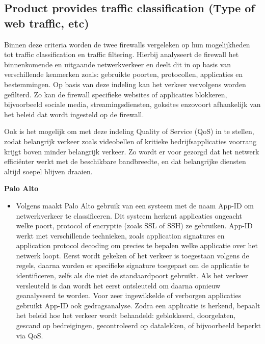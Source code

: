 \subsection{Product provides traffic classification (Type of web traffic, etc)}

Binnen deze criteria worden de twee firewalls vergeleken op hun mogelijkheden tot traffic classification en traffic filtering. Hierbij analyseert de firewall het binnenkomende en uitgaande netwerkverkeer en deelt dit in op basis van verschillende kenmerken zoals: gebruikte poorten, protocollen, applicaties en bestemmingen. Op basis van deze indeling kan het verkeer vervolgens worden gefilterd. Zo kan de firewall specifieke websites of applicaties blokkeren, bijvoorbeeld sociale media, streamingsdiensten, goksites enzovoort afhankelijk van het beleid dat wordt ingesteld op de firewall.

Ook is het mogelijk om met deze indeling Quality of Service (QoS) in te stellen, zodat belangrijk verkeer zoals videobellen of kritieke bedrijfsapplicaties voorrang krijgt boven minder belangrijk verkeer. Zo wordt er voor gezorgd dat het netwerk efficiënter werkt met de beschikbare bandbreedte, en dat belangrijke diensten altijd soepel blijven draaien.

\textbf{Palo Alto}
\begin{itemize}[label=\textbullet]
    \item Volgens \textcite{PaloAltoAPP2025} maakt Palo Alto gebruik van een systeem met de naam App-ID om netwerkverkeer te classificeren. Dit systeem herkent applicaties ongeacht welke poort, protocol of encryptie (zoals SSL of SSH) ze gebruiken. App-ID werkt met verschillende technieken, zoals application signatures en application protocol decoding om precies te bepalen welke applicatie over het netwerk loopt. Eerst wordt gekeken of het verkeer is toegestaan volgens de regels, daarna worden er specifieke signature toegepast om de applicatie te identificeren, zelfs als die niet de standaardpoort gebruikt. Als het verkeer versleuteld is dan wordt het eerst ontsleuteld om daarna opnieuw geanalyseerd te worden. Voor zeer ingewikkelde of verborgen applicaties gebruikt App-ID ook gedragsanalyse. Zodra een applicatie is herkend, bepaalt het beleid hoe het verkeer wordt behandeld: geblokkeerd, doorgelaten, gescand op bedreigingen, gecontroleerd op datalekken, of bijvoorbeeld beperkt via QoS.
\end{itemize}

